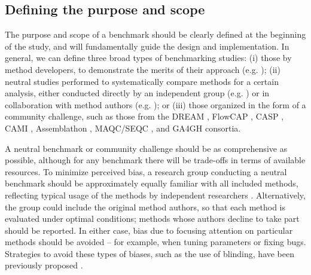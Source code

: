 \subsection{Defining the purpose and scope}

The purpose and scope of a benchmark should be clearly defined at the beginning of the study, and will fundamentally guide the design and implementation. In general, we can define three broad types of benchmarking studies: (i) those by method developers, to demonstrate the merits of their approach (e.g. \cite{weber_diffcytdifferentialdiscovery_2019,nowicka_drimseqdirichletmultinomialframework_2016,levine_datadrivenphenotypicdissection_2015,zhou_robustlydetectingdifferential_2014,law_voomprecisionweights_2014}); (ii) neutral studies performed to systematically compare methods for a certain analysis, either conducted directly by an independent group (e.g. \cite{saelens_comparisonsinglecelltrajectory_2019,duo_systematicperformanceevaluation_2018,soneson_biasrobustnessscalability_2018,saelens_comprehensiveevaluationmodule_2018,weber_comparisonclusteringmethods_2016,korthauer_practicalguidemethods_2019,freytag_comparisonclusteringtools_2018,baruzzo_simulationbasedcomprehensivebenchmarking_2017,kanitz_comparativeassessmentmethods_2015,soneson_comparisonmethodsdifferential_2013,rapaport_comprehensiveevaluationdifferential_2013,dillies_comprehensiveevaluationnormalization_2013}) or in collaboration with method authors (e.g. \cite{sage_quantitativeevaluationsoftware_2015}); or (iii) those organized in the form of a community challenge, such as those from the DREAM \cite{weirauch_evaluationmethodsmodeling_2013,costello_communityeffortassess_2014,kuffner_crowdsourcedanalysisclinical_2015,ewing_combiningtumorgenome_2015,hill_inferringcausalmolecular_2016}, FlowCAP \cite{aghaeepour_criticalassessmentautomated_2013,aghaeepour_benchmarkevaluationalgorithms_2016}, CASP \cite{moult_criticalassessmentmethods_2018,moult_criticalassessmentmethods_2016}, CAMI \cite{sczyrba_criticalassessmentmetagenome_2017}, Assemblathon \cite{earl_assemblathoncompetitiveassessment_2011,bradnam_assemblathonevaluatingnovo_2013}, MAQC/SEQC \cite{maqcconsortium_microarrayqualitycontrol_2006,shi_microarrayqualitycontrol_2010,seqc_comprehensiveassessmentrnaseq_2014}, and GA4GH \cite{krusche_bestpracticesbenchmarking_2019} consortia.

A neutral benchmark or community challenge should be as comprehensive as possible, although for any benchmark there will be trade-offs in terms of available resources. To minimize perceived bias, a research group conducting a neutral benchmark should be approximately equally familiar with all included methods, reflecting typical usage of the methods by independent researchers \cite{boulesteix_pleaneutralcomparison_2013}. Alternatively, the group could include the original method authors, so that each method is evaluated under optimal conditions; methods whose authors decline to take part should be reported. In either case, bias due to focusing attention on particular methods should be avoided -- for example, when tuning parameters or fixing bugs. Strategies to avoid these types of biases, such as the use of blinding, have been previously proposed \cite{boulesteix_evidencebasedcomputationalstatistics_2017}.

